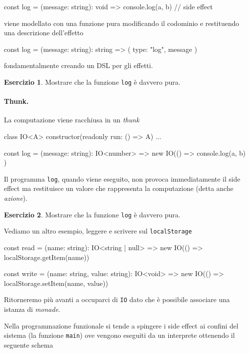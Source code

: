 \documentclass[12pt]{article}
\theoremstyle{definition}
\newtheorem{exercise}{Esercizio}[section]
\newenvironment{code}
  {\vspace{0.5cm} \VerbatimEnvironment\begin{typescriptcode}}
  {\end{typescriptcode} \vspace{0.2cm}}
\begin{document}
\begin{code}
const log = (message: string): void => {
  console.log(a, b) // side effect
}
\end{code}

viene modellato con una funzione pura modificando il codominio e restituendo una descrizione dell'effetto

\begin{code}
const log = (message: string): string => ({
  type: "log",
  message
})
\end{code}

fondamentalmente creando un DSL per gli effetti.

\begin{exercise}
Mostrare che la funzione \texttt{log} è davvero pura.
\end{exercise}

\paragraph{Thunk.} La computazione viene racchiusa in un \emph{thunk}

\begin{code}
class IO<A> {
  constructor(readonly run: () => A) {}
  ...
}

const log = (message: string): IO<number> =>
  new IO(() => {
    console.log(a, b)
  })
\end{code}

Il programma \texttt{log}, quando viene eseguito, non provoca immediatamente il side effect ma restituisce un valore che rappresenta
la computazione (detta anche \emph{azione}).

\begin{exercise}
Mostrare che la funzione \texttt{log} è davvero pura.
\end{exercise}

Vediamo un altro esempio, leggere e scrivere sul \texttt{localStorage}

\begin{code}
const read = (name: string): IO<string | null> =>
  new IO(() => localStorage.getItem(name))

const write = (name: string, value: string): IO<void> =>
  new IO(() => localStorage.setItem(name, value))
\end{code}

Ritorneremo più avanti a occuparci di \texttt{IO} dato che è possibile associare una istanza di \emph{monade}.

Nella programmazione funzionale si tende a spingere i side effect ai confini del sistema (la funzione \texttt{main})
ove vengono eseguiti da un interprete ottenendo il seguente schema
\end{document}
